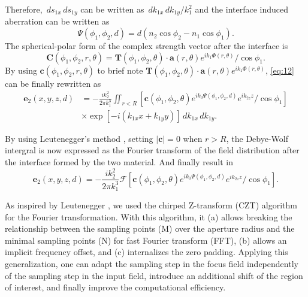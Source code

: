 \documentclass[9pt,twocolumn,twoside]{osajnl}
\begin{document}
Therefore, $\,ds_{1x}\,ds_{1y}$ can be written as $\,dk_{1x}\,dk_{1y}/k_1^2$ and the interface induced aberration can be written as 
\begin{equation}\label{eq:14}
	\Psi(\phi_1,\phi_2,d)=d(n_2\cos\phi_2-n_1\cos\phi_1).
\end{equation}
The spherical-polar form of the complex strength vector after the interface is
\begin{equation}\label{eq:15}
	\mathbf{C}(\phi_1,\phi_2,r,\theta)=\mathbf{T}(\phi_1,\phi_2,\theta)\cdot\mathbf{a}(r,\theta)e^{ik_1\Phi(r,\theta)}/\cos\phi_1.
\end{equation}
By using $\mathbf{c}(\phi_1,\phi_2,r,\theta)$ to brief note $\mathbf{T}(\phi_1,\phi_2,\theta)\cdot\mathbf{a}(r,\theta)e^{ik_1\Phi(r,\theta)}$, \eqref{eq:12} can be finally rewritten as
\begin{equation}
	\begin{aligned}\label{eq:16}
		\mathbf{e}_2(x,y,z,d)&=-\frac{ik^2_2}{2\pi k^3_1}
		\iint_{r<R}[\mathbf{c}(\phi_1,\phi_2,\theta)e^{ik_0\Psi(\phi_1,\phi_2,d)}e^{ik_{2z}z}/\cos\phi_1]\\
		&\times \exp[-i(k_{1x}x+k_{1y}y)]\,dk_{1x}\,dk_{1y}.
	\end{aligned}
\end{equation}

By using Leutenegger's method \cite{leutenegger2006fast}, setting $|\mathbf{c}|=0$ when $r>R$, the Debye-Wolf intergral is now expressed as the Fourier transform of the field distribution after the interface formed by the two material. And finally result in
\begin{equation}\label{eq:17}
	\mathbf{e}_2(x,y,z,d)=-\frac{ik^2_2}{2\pi k^3_1}\mathcal{F}[\mathbf{c}(\phi_1,\phi_2,\theta)e^{ik_0\Psi(\phi_1,\phi_2,d)}e^{ik_{2z}z}/\cos\phi_1].
\end{equation}

As inspired by Leutenegger \cite{leutenegger2006fast}, we used the chirped Z-transform (CZT) algorithm \cite{Bakx2002} for the Fourier transformation. With this algorithm, it (a) allows breaking the relationship between the sampling points (M) over the aperture radius and the minimal sampling points (N) for fast Fourier transform (FFT), (b) allows an implicit frequency offset, and (c) internalizes the zero padding. Applying this generalization, one can adapt the sampling step in the focus field independently of the sampling step in the input field, introduce an additional shift of the region of interest, and finally improve the computational efficiency.
\end{document}

